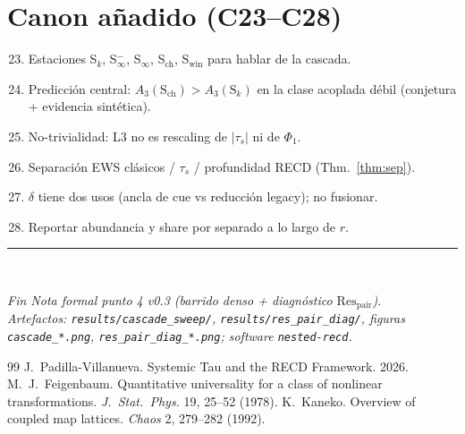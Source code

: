 \documentclass[11pt,a4paper]{article}
\theoremstyle{definition}
\theoremstyle{plain}
\theoremstyle{remark}
\newcommand{\Res}{\mathrm{Res}}
\newcommand{\ts}{\tau_s}
\begin{document}
\section{Canon a\~nadido (C23--C28)}
\label{sec:canon}

\begin{enumerate}[label=\textbf{C\arabic*.}]
  \setcounter{enumi}{22}
  \item Estaciones S$_k$, S$_\infty^-$, S$_\infty$, S$_{\mathrm{ch}}$,
  S$_{\mathrm{win}}$ para hablar de la cascada.
  \item Predicci\'on central: $A_3(\mathrm{S}_{\mathrm{ch}})>A_3(\mathrm{S}_k)$
  en la clase acoplada d\'ebil (conjetura + evidencia sint\'etica).
  \item No-trivialidad: L3 no es rescaling de $|\ts|$ ni de $\Phi_1$.
  \item Separaci\'on EWS cl\'asicos / $\ts$ / profundidad RECD
  (Thm.~\ref{thm:sep}).
  \item $\delta$ tiene dos usos (ancla de cue vs reducci\'on legacy);
  no fusionar.
  \item Reportar abundancia y share por separado a lo largo de $r$.
\end{enumerate}

\vspace{1.5em}
\noindent\rule{\textwidth}{0.4pt}\\[0.5em]
\begin{center}
\em Fin Nota formal punto 4 v0.3 (barrido denso + diagn\'ostico
$\Res_{\mathrm{pair}}$).\\
Artefactos: \texttt{results/cascade\_sweep/},
\texttt{results/res\_pair\_diag/}, figuras
\texttt{cascade\_*.png}, \texttt{res\_pair\_diag\_*.png};
software \texttt{nested-recd}.
\end{center}

\begin{thebibliography}{99}
J.~Padilla-Villanueva. Systemic Tau and the RECD Framework. 2026.
M.~J.~Feigenbaum. Quantitative universality for a class of nonlinear
transformations. \emph{J.\ Stat.\ Phys.} 19, 25--52 (1978).
K.~Kaneko. Overview of coupled map lattices.
\emph{Chaos} 2, 279--282 (1992).
\end{thebibliography}
\end{document}
